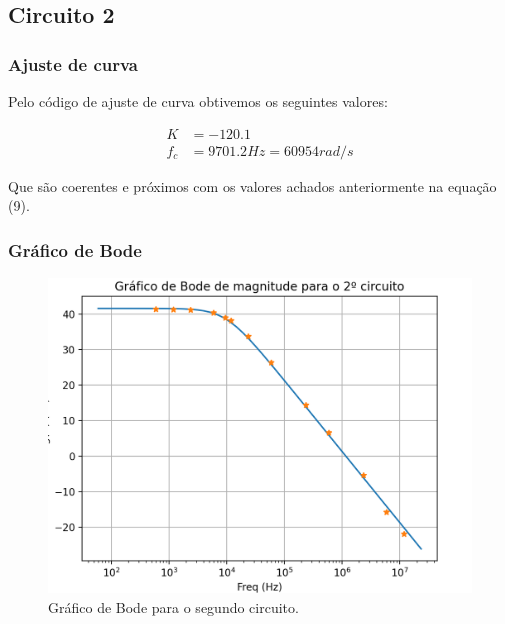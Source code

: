 \documentclass[12pt,twoside, a4paper, twocolumn]{article}
\begin{document}
\subsection{Circuito 2}


\subsubsection{Ajuste de curva}


Pelo código de ajuste de curva obtivemos os seguintes valores:


\begin{equation}
    \begin{aligned}
        K   & = -120.1                   \\
        f_c & =  9701.2 Hz = 60954 rad/s
    \end{aligned}
\end{equation}


Que são coerentes e próximos com os valores achados anteriormente na equação (9).


\subsubsection{Gráfico de Bode}


\begin{figure}[H]
    \centering
    \includegraphics[width=1\columnwidth]{images/bode2.png}
    \caption{Gráfico de Bode para o segundo circuito.}
\end{figure}
\end{document}
